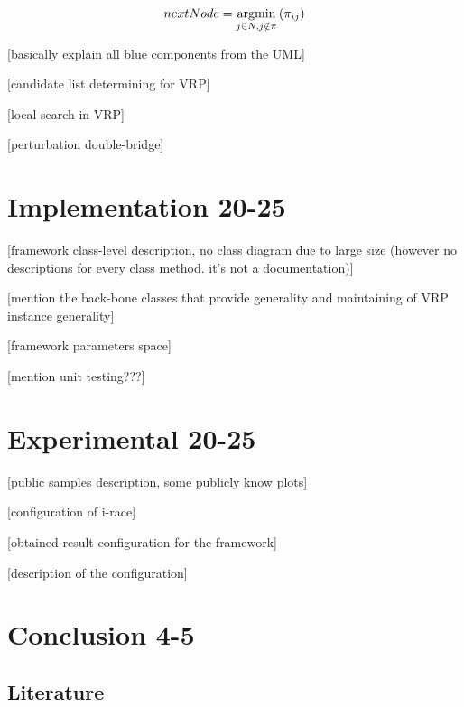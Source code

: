 \documentclass[11pt,a4paper,oneside]{book}
\begin{document}
\begin{equation}
nextNode = \operatornamewithlimits{argmin} \limits_{j \in N, j \notin \pi} {(\pi_{ij})}
\end{equation}

[basically explain all blue components from the UML]

[candidate list determining for VRP]

[local search in VRP]

[perturbation double-bridge]

\chapter{Implementation 20-25}

[framework class-level description, no class diagram due to large size (however no descriptions for every class method. it's not a documentation)] \newline

[mention the back-bone classes that provide generality and maintaining of VRP instance generality] \newline 

[framework parameters space] \newline

[mention unit testing???] \newline


\chapter{Experimental 20-25}

[public samples description, some publicly know plots] \newline

[configuration of i-race] \newline

[obtained result configuration for the framework] \newline

[description of the configuration]


\chapter{Conclusion 4-5}




\section{Literature}




\appendix

\backmatter

\printindex %






\end{document}
